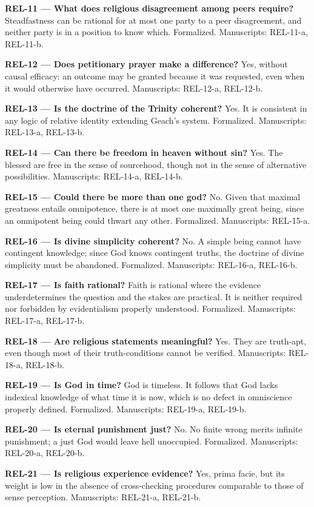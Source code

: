 \documentclass[10pt]{article}
\begin{document}
\textbf{REL-11 --- What does religious disagreement among peers require?} Steadfastness can be rational for at most one party to a peer disagreement, and neither party is in a position to know which. Formalized. Manuscripts: REL-11-a, REL-11-b.

\textbf{REL-12 --- Does petitionary prayer make a difference?} Yes, without causal efficacy: an outcome may be granted because it was requested, even when it would otherwise have occurred. Manuscripts: REL-12-a, REL-12-b.

\textbf{REL-13 --- Is the doctrine of the Trinity coherent?} Yes. It is consistent in any logic of relative identity extending Geach's system. Formalized. Manuscripts: REL-13-a, REL-13-b.

\textbf{REL-14 --- Can there be freedom in heaven without sin?} Yes. The blessed are free in the sense of sourcehood, though not in the sense of alternative possibilities. Manuscripts: REL-14-a, REL-14-b.

\textbf{REL-15 --- Could there be more than one god?} No. Given that maximal greatness entails omnipotence, there is at most one maximally great being, since an omnipotent being could thwart any other. Formalized. Manuscripts: REL-15-a.

\textbf{REL-16 --- Is divine simplicity coherent?} No. A simple being cannot have contingent knowledge; since God knows contingent truths, the doctrine of divine simplicity must be abandoned. Formalized. Manuscripts: REL-16-a, REL-16-b.

\textbf{REL-17 --- Is faith rational?} Faith is rational where the evidence underdetermines the question and the stakes are practical. It is neither required nor forbidden by evidentialism properly understood. Formalized. Manuscripts: REL-17-a, REL-17-b.

\textbf{REL-18 --- Are religious statements meaningful?} Yes. They are truth-apt, even though most of their truth-conditions cannot be verified. Manuscripts: REL-18-a, REL-18-b.

\textbf{REL-19 --- Is God in time?} God is timeless. It follows that God lacks indexical knowledge of what time it is now, which is no defect in omniscience properly defined. Formalized. Manuscripts: REL-19-a, REL-19-b.

\textbf{REL-20 --- Is eternal punishment just?} No. No finite wrong merits infinite punishment; a just God would leave hell unoccupied. Formalized. Manuscripts: REL-20-a, REL-20-b.

\textbf{REL-21 --- Is religious experience evidence?} Yes, prima facie, but its weight is low in the absence of cross-checking procedures comparable to those of sense perception. Manuscripts: REL-21-a, REL-21-b.
\end{document}

